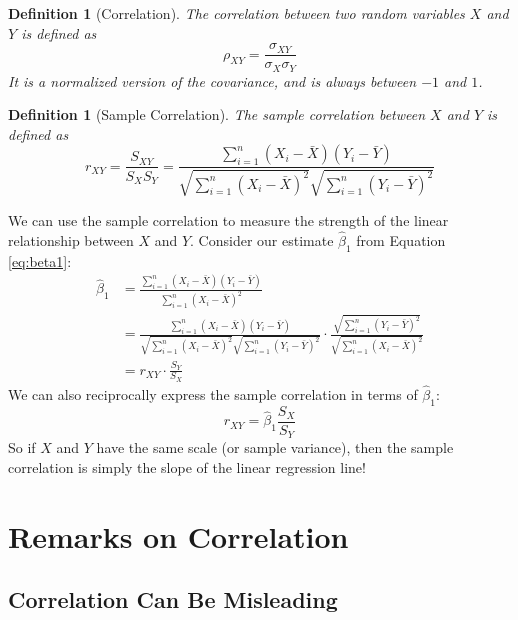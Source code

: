 \documentclass[twoside]{article}
\newtheorem{definition}[theorem]{Definition}
\theoremstyle{definition}
\begin{document}
\begin{definition}[Correlation]
    The correlation between two random variables $X$ and $Y$ is defined as
    \begin{equation}
        \rho_{XY} = \frac{\sigma_{XY}}{\sigma_X \sigma_Y}
    \end{equation}
    It is a normalized version of the covariance, and is always between $-1$ and $1$.
\end{definition}
\begin{definition}[Sample Correlation]
    The sample correlation between $X$ and $Y$ is defined as
    \begin{equation}
        r_{XY} = \frac{S_{XY}}{S_X S_Y} = \frac{\sum_{i=1}^n (X_i - \bar{X})(Y_i - \bar{Y})}{\sqrt{\sum_{i=1}^n (X_i - \bar{X})^2} \sqrt{\sum_{i=1}^n (Y_i - \bar{Y})^2}}
    \end{equation}
\end{definition}
We can use the sample correlation to measure the strength of the linear relationship between $X$ and $Y$. Consider our estimate $\widehat{\beta}_1$ from Equation \ref{eq:beta1}:
\begin{align}
    \widehat{\beta}_1 &= \frac{\sum_{i=1}^n (X_i - \bar{X})(Y_i - \bar{Y})}{\sum_{i=1}^n (X_i - \bar{X})^2} \nonumber \\
    &= \frac{\sum_{i=1}^n (X_i - \bar{X})(Y_i - \bar{Y})}{\sqrt{\sum_{i=1}^n (X_i - \bar{X})^2} \sqrt{\sum_{i=1}^n (Y_i - \bar{Y})^2}} \cdot \frac{\sqrt{\sum_{i=1}^n (Y_i - \bar{Y})^2}}{\sqrt{\sum_{i=1}^n (X_i - \bar{X})^2}} \nonumber \\
    &= r_{XY} \cdot \frac{S_Y}{S_X}
\end{align}
We can also reciprocally express the sample correlation in terms of $\widehat{\beta}_1$:
\begin{equation}
    r_{XY} = \widehat{\beta}_1 \frac{S_X}{S_Y}
\end{equation}
So if $X$ and $Y$ have the same scale (or sample variance), then the sample correlation is simply the slope of the linear regression line!

\section{Remarks on Correlation}

\subsection{Correlation Can Be Misleading}
\end{document}
